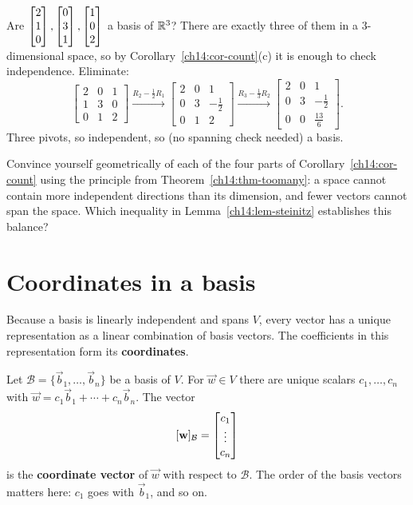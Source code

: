 \begin{example}
\label{ch14:ex-count}
Are $\begin{bmatrix}2\\1\\0\end{bmatrix},\begin{bmatrix}0\\3\\1\end{bmatrix},\begin{bmatrix}1\\0\\2\end{bmatrix}$ a basis of $\mathbb{R}^3$? There
are exactly three of them in a $3$-dimensional space, so by
Corollary~\ref{ch14:cor-count}(c) it is enough to check independence. Eliminate:
\[
  \begin{bmatrix} 2 & 0 & 1\\ 1 & 3 & 0\\ 0 & 1 & 2\end{bmatrix}
  \xrightarrow{R_2-\frac12 R_1}
  \begin{bmatrix} 2 & 0 & 1\\ 0 & 3 & -\frac12\\ 0 & 1 & 2\end{bmatrix}
  \xrightarrow{R_3-\frac13 R_2}
  \begin{bmatrix} 2 & 0 & 1\\ 0 & 3 & -\frac12\\ 0 & 0 & \frac{13}{6}\end{bmatrix}.
\]
Three pivots, so independent, so (no spanning check needed) a basis.
\end{example}

\begin{walkbox}
Convince yourself geometrically of each of the four parts of
Corollary~\ref{ch14:cor-count} using the principle from
Theorem~\ref{ch14:thm-toomany}: a space cannot contain more independent
directions than its dimension, and fewer vectors cannot span the space. Which
inequality in Lemma~\ref{ch14:lem-steinitz} establishes this balance?
\end{walkbox}

\section{Coordinates in a basis}
\label{ch14:coords}

Because a basis is linearly independent and spans $V$, every vector has a unique
representation as a linear combination of basis vectors. The coefficients in
this representation form its \textbf{coordinates}.

\begin{definition}[Coordinates]
\label{ch14:def-coords}
Let $\mathcal B = \{\vec{b}_1,\dots,\vec{b}_n\}$ be a basis of $V$. For $\vec{w}
\in V$ there are unique scalars $c_1,\dots,c_n$ with $\vec{w} = c_1\vec{b}_1 +
\cdots + c_n\vec{b}_n$. The vector
\[
  [\mathbf{w}]_{\mathcal B} = \begin{bmatrix}c_1\\\vdots\\c_n\end{bmatrix}
\]
is the \textbf{coordinate vector} of $\vec{w}$ with respect to $\mathcal B$.
The order of the basis vectors matters here: $c_1$ goes with $\vec{b}_1$, and so on.
\end{definition}

